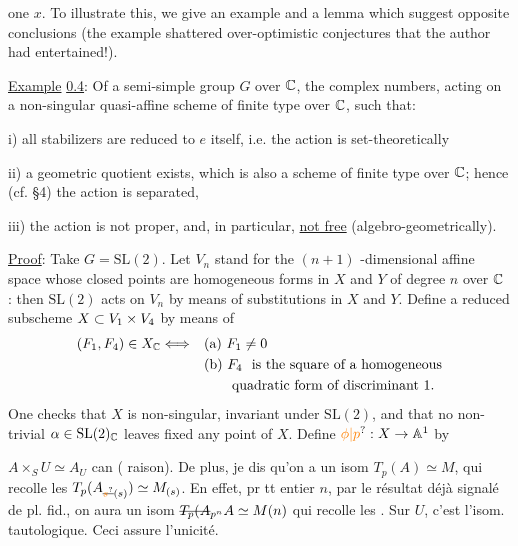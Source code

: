 
one $x$. To illustrate this, we give an example and a lemma which suggest opposite conclusions (the example shattered over-optimistic conjectures that the author had entertained!).

\uline{Example} \uline{0.4}: Of a semi-simple group $G$ over $\mathbb C$, the complex numbers, acting on a non-singular quasi-affine scheme of finite type over $\mathbb C$, such that:

i) all stabilizers are reduced to $e$ itself, i.e. the action is set-theoretically 

ii) a geometric quotient exists, which is also a scheme of finite type over $\mathbb C$; hence (cf. \S4) the action is separated,

\margin{\handwritten{\unsure{$\sim$!|!}}}
iii) the action is not proper, and, in particular, \uline{not free} (algebro-geometrically).

\uline{Proof}: Take $G=\mathrm{SL}(2)$. Let $V_n$ stand for the $(n+1)$ -dimensional affine space whose closed points are homogeneous forms in $X$ and $Y$ of degree $n$ over $\mathbb C$ : then $\mathrm{SL}(2)$ acts on $V_n$ by means of substitutions in $X$ and $Y$. Define a reduced subscheme $X\subset V_1\times V_4$ by means of
\[
\begin{aligned}
(F_1,F_4)\in X_{\mathbb C}\Longleftrightarrow &\quad\text{(a) }F_1\ne 0\\
 &\quad\text{(b) }F_4\ \text{ is the square of a homogeneous}\\
 &\qquad\quad\text{quadratic form of discriminant 1.}
\end{aligned}
\]
One checks that $X$ is non-singular, invariant under $\mathrm{SL}(2)$, and that no non-trivial $\alpha\in\mathrm{SL}(2)_{\mathbb C}$ leaves fixed any point of $X$. Define $\unsure{\phi|p}:X\handwritten{\to\mathbb A}^{1}$ by

$A\times_S U\simeq A_U$ can ( raison). De plus, je dis qu'on a un isom $T_p(A)\simeq M$, qui recolle les $T_p(A_{\deleted{\unsure{s}}(s)})\simeq M_{(s)}$. En effet, pr tt entier $n$, par le résultat déjà signalé de pl. fid., on aura un isom $\deleted{T_p(A}{}_{p^n}A\simeq M(n)$ qui recolle les
. Sur $U$, c'est l'isom. tautologique. Ceci assure l'unicité.

